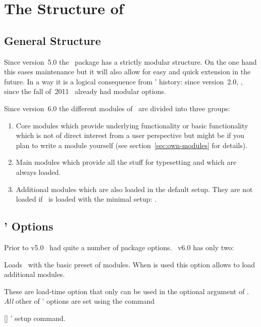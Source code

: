 \documentclass{chemmacros-manual}
\begin{document}
\section{The Structure of \chemmacros}\label{sec:structure-chemmacros}
\subsection{General Structure}
Since version~5.0 the \chemmacros\ package has a strictly modular
structure.  On the one hand this eases maintenance but it
will also allow for easy and quick extension in the future.  In a way it is a
logical consequence from \chemmacros' history: since version~2.0, \ie, since
the fall of~2011 \chemmacros\ already had modular options.

Since version~6.0 the different modules of \chemmacros\ are divided into three
groups:
\begin{enumerate}
  \item Core modules which provide underlying functionality or basic
    functionality which is not of direct interest from a user perspective but
    might be if you plan to write a module yourself (see
    section~\ref{sec:own-modules} for details).
  \item Main modules which provide all the stuff for typesetting and which are
    always loaded.
  \item Additional modules which are also loaded in the default setup. They
    are not loaded if \chemmacros\ is loaded with the minimal setup:
    .
\end{enumerate}

\subsection{\chemmacros' Options}\label{sec:using-chemm-opti}
Prior to v5.0 \chemmacros\ had quite a number of package options.
\chemmacros\ v6.0 has only two:
\begin{options}
    Loads \chemmacros\ with the basic preset of modules.
  \Default
    When  is used this option allows to load additional
    modules.
\end{options}
These are load-time option that only can be used in the optional argument of
. \emph{All} other of \chemmacros' options are set using the
command
\begin{commands}
  []
    \chemmacros' setup command.
\end{commands}
\end{document}
